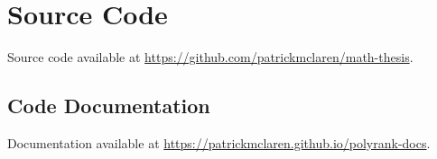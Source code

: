 \documentclass{amsart}
\theoremstyle{definition}
\theoremstyle{remark}
\numberwithin{equation}{section}
\begin{document}
%

\section{Source Code}

Source code available at \url{https://github.com/patrickmclaren/math-thesis}.

\subsection{Code Documentation}

Documentation available at \url{https://patrickmclaren.github.io/polyrank-docs}.

\newpage

%
%

\newpage

\printbibliography
\end{document}
